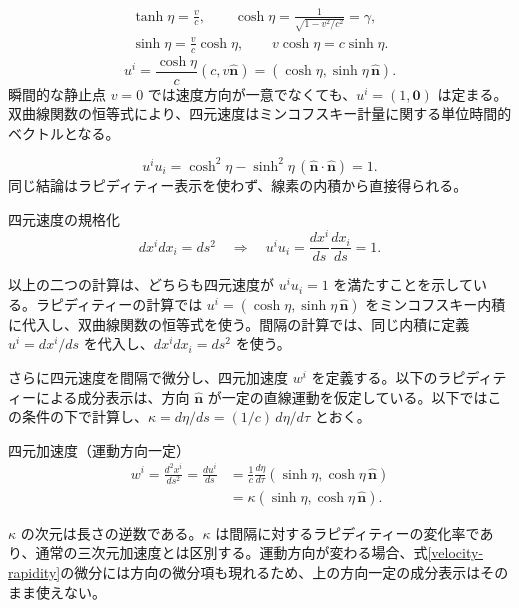 \documentclass[a4paper,12pt]{article}
\begin{document}
\begin{equation}\label{rapidity-identities}
\begin{gathered}\tanh\eta=\frac vc,\qquad\cosh\eta=\frac1{\sqrt{1-v^2/c^2}}=\gamma,\\\sinh\eta=\frac vc\cosh\eta,\qquad v\cosh\eta=c\sinh\eta.\end{gathered}
\end{equation}
\begin{equation}\label{velocity-rapidity}
u^i=\frac{\cosh\eta}{c}(c,v\widehat{\boldsymbol n})=(\cosh\eta,\sinh\eta\,\widehat{\boldsymbol n}).
\end{equation}
瞬間的な静止点 $v=0$ では速度方向が一意でなくても、$u^i=(1,\boldsymbol 0)$ は定まる。双曲線関数の恒等式により、四元速度はミンコフスキー計量に関する単位時間的ベクトルとなる。

\begin{equation}\label{velocity-unit-rapidity}
u^iu_i=\cosh^2\eta-\sinh^2\eta\,(\widehat{\boldsymbol n}\cdot\widehat{\boldsymbol n})=1.
\end{equation}
同じ結論はラピディティー表示を使わず、線素の内積から直接得られる。

\begin{resultBox}{四元速度の規格化}
\begin{equation}\label{velocity-unit-interval}
dx^i dx_i=ds^2\quad\Longrightarrow\quad u^iu_i=\frac{dx^i}{ds}\frac{dx_i}{ds}=1.
\end{equation}
\end{resultBox}

以上の二つの計算は、どちらも四元速度が $u^iu_i=1$ を満たすことを示している。ラピディティーの計算では $u^i=(\cosh\eta,\sinh\eta\,\widehat{\boldsymbol n})$ をミンコフスキー内積に代入し、双曲線関数の恒等式を使う。間隔の計算では、同じ内積に定義 $u^i=dx^i/ds$ を代入し、$dx^idx_i=ds^2$ を使う。

さらに四元速度を間隔で微分し、四元加速度 $w^i$ を定義する。以下のラピディティーによる成分表示は、方向 $\widehat{\boldsymbol n}$ が一定の直線運動を仮定している。以下ではこの条件の下で計算し、$\kappa=d\eta/ds=(1/c)\,d\eta/d\tau$ とおく。

\begin{definitionBox}{四元加速度（運動方向一定）}
\begin{equation}\label{four-acceleration}
\begin{aligned}w^i=\frac{d^2x^i}{ds^2}=\frac{du^i}{ds}&=\frac1c\frac{d\eta}{d\tau}(\sinh\eta,\cosh\eta\,\widehat{\boldsymbol n})\\&=\kappa(\sinh\eta,\cosh\eta\,\widehat{\boldsymbol n}).\end{aligned}
\end{equation}
\end{definitionBox}
$\kappa$ の次元は長さの逆数である。$\kappa$ は間隔に対するラピディティーの変化率であり、通常の三次元加速度とは区別する。運動方向が変わる場合、式\eqref{velocity-rapidity}の微分には方向の微分項も現れるため、上の方向一定の成分表示はそのまま使えない。
\end{document}
